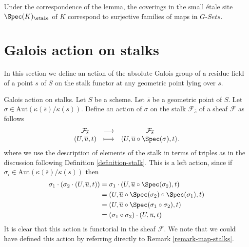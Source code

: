 \begin{remark}
\label{remark-covering-surjective}
Under the correspondence of the lemma, the coverings in the small \'etale site
$\Spec(K)_\etale$ of $K$ correspond to surjective families of
maps in $G\textit{-Sets}$.
\end{remark}







\section{Galois action on stalks}
\label{section-galois-action-stalks}

\noindent
In this section we define an action of the absolute Galois group of a residue
field of a point $s$ of $S$ on the stalk functor at any geometric point lying
over $s$.

\medskip\noindent
Galois action on stalks.
Let $S$ be a scheme.
Let $\overline{s}$ be a geometric point of $S$.
Let $\sigma \in \text{Aut}(\kappa(\overline{s})/\kappa(s))$.
Define an action of $\sigma$ on the stalk $\mathcal{F}_{\overline{s}}$
of a sheaf $\mathcal{F}$ as follows
\begin{equation}
\label{equation-galois-action}
\begin{matrix}
\mathcal{F}_{\overline{s}} &
\longrightarrow &
\mathcal{F}_{\overline{s}} \\
(U, \overline{u}, t) &
\longmapsto &
(U, \overline{u} \circ \Spec(\sigma), t).
\end{matrix}
\end{equation}
where we use the description of elements of the stalk in terms of triples
as in the discussion following
Definition \ref{definition-stalk}.
This is a left action, since if
$\sigma_i \in \text{Aut}(\kappa(\overline{s})/\kappa(s))$
then
\begin{align*}
\sigma_1 \cdot (\sigma_2 \cdot (U, \overline{u}, t))
& =
\sigma_1 \cdot (U, \overline{u} \circ \Spec(\sigma_2), t) \\
& =
(U, \overline{u} \circ \Spec(\sigma_2) \circ \Spec(\sigma_1), t) \\
& =
(U, \overline{u} \circ \Spec(\sigma_1 \circ \sigma_2), t) \\
& =
(\sigma_1 \circ \sigma_2) \cdot (U, \overline{u}, t)
\end{align*}
It is clear that this action is functorial in the sheaf $\mathcal{F}$.
We note that we could have defined this action by referring directly to
Remark \ref{remark-map-stalks}.

